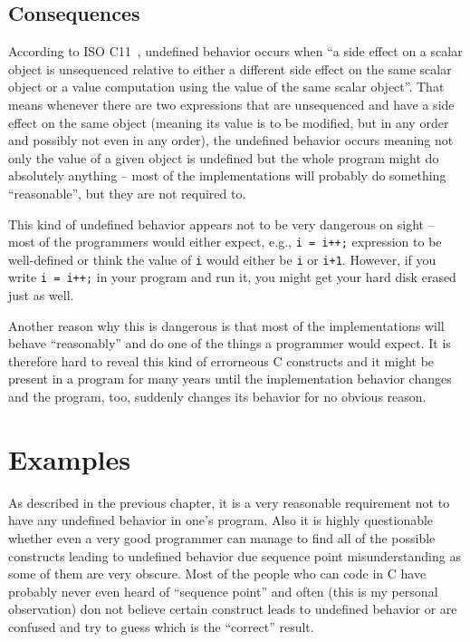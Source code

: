\section{Consequences}%
According to ISO C11~\cite{WG14N1570}, undefined behavior occurs when ``a side effect on a scalar object is unsequenced relative to either a different side effect on the same scalar object or a value computation using the value of the same scalar object''. That means whenever there are two expressions that are unsequenced and have a side effect on the same object (meaning its value is to be modified, but in any order and possibly not even in any order), the undefined behavior occurs meaning not only the value of a given object is undefined but the whole program might do absolutely anything -- most of the implementations will probably do something ``reasonable'', but they are not required to.

This kind of undefined behavior appears not to be very dangerous on sight -- most of the programmers would either expect, e.g., \verb|i = i++;| expression to be well-defined or think the value of \verb|i| would either be \verb|i| or \verb|i+1|.
However, if you write \verb|i = i++;| in your program and run it, you might get your hard disk erased just as well.

Another reason why this is dangerous is that most of the implementations will behave ``reasonably'' and do one of the things a programmer would expect. It is therefore hard to reveal this kind of errorneous C constructs and it might be present in a program for many years until the implementation behavior changes and the program, too, suddenly changes its behavior for no obvious reason.

\chapter{Examples}
As described in the previous chapter, it is a very reasonable requirement not to have any undefined behavior in one's program. Also it is highly questionable whether even a very good programmer can manage to find all of the possible constructs leading to undefined behavior due sequence point misunderstanding as some of them are very obscure. Most of the people who can code in C have probably never even heard of ``sequence point'' and often (this is my personal observation) don not believe certain construct leads to undefined behavior or are confused and try to guess which is the ``correct'' result.

